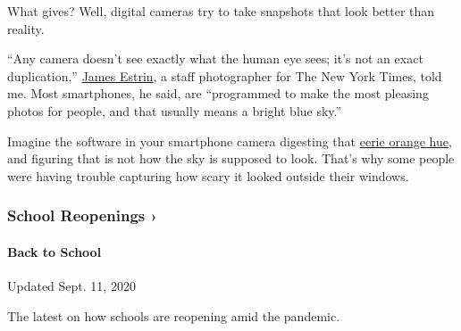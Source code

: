 What gives? Well, digital cameras try to take snapshots that look better
than reality.

``Any camera doesn't see exactly what the human eye sees; it's not an
exact duplication,''
\href{https://www.nytimes3xbfgragh.onion/by/james-estrin}{James Estrin},
a staff photographer for The New York Times, told me. Most smartphones,
he said, are ``programmed to make the most pleasing photos for people,
and that usually means a bright blue sky.''

Imagine the software in your smartphone camera digesting that
\href{https://twitter.com/AirDistrict/status/1303746736414883840}{eerie
orange hue}, and figuring that is not how the sky is supposed to look.
That's why some people were having trouble capturing how scary it looked
outside their windows.

\href{https://www.nytimes3xbfgragh.onion/spotlight/schools-reopening?action=click\&pgtype=Article\&state=default\&region=MAIN_CONTENT_3\&context=storylines_keepup}{}

\hypertarget{school-reopenings-}{%
\subsubsection{School Reopenings ›}\label{school-reopenings-}}

\hypertarget{back-to-school}{%
\paragraph{Back to School}\label{back-to-school}}

Updated Sept. 11, 2020

The latest on how schools are reopening amid the pandemic.

